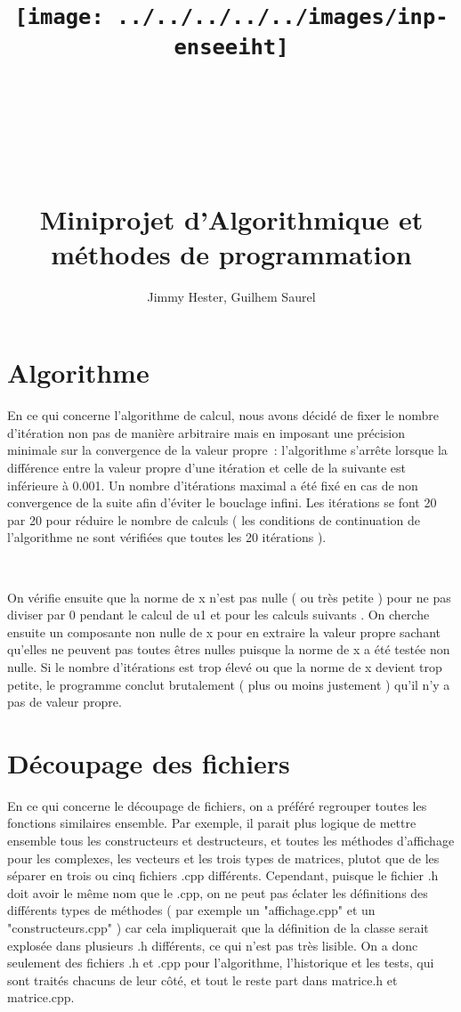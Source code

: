 \documentclass[a4paper]{article}
\title{\texttt{[image: ../../../../../images/inp-enseeiht]} \\ ~ \\ ~ \\ ~ \\ ~ \\ Miniprojet d'Algorithmique et méthodes de programmation}
\author{Jimmy Hester, Guilhem Saurel}
\date{\oldstylenums{\today}}
\begin{document}
\begin{titlepage}
 \maketitle
\end{titlepage}

\tableofcontents
\newpage

\section{Algorithme}

En ce qui concerne l'algorithme de calcul, nous avons décidé de fixer le nombre d'itération non pas de manière arbitraire mais en imposant une précision minimale sur la convergence de la valeur propre : l'algorithme s’arrête lorsque la différence entre la valeur propre d'une itération et celle de la suivante est inférieure à 0.001. Un nombre d'itérations maximal a été fixé en cas de non convergence de la suite afin d'éviter le bouclage infini. Les itérations se font 20 par 20 pour réduire le nombre de calculs ( les conditions de continuation de l'algorithme ne sont vérifiées que toutes les 20 itérations ).

~

On vérifie ensuite que la norme de x n'est pas nulle ( ou très petite ) pour ne pas diviser par 0 pendant le calcul de u1 et pour les calculs suivants . On cherche ensuite un composante non nulle de x pour en extraire la valeur propre sachant qu'elles ne peuvent pas toutes êtres nulles puisque la norme de x a été testée non nulle. Si le nombre d'itérations est trop élevé ou que la norme de x devient trop petite, le programme conclut brutalement ( plus ou moins justement ) qu'il n'y a pas de valeur propre.

\section{Découpage des fichiers}

En ce qui concerne le découpage de fichiers, on a préféré regrouper toutes les fonctions similaires ensemble. Par exemple, il parait plus logique de mettre ensemble tous les constructeurs et destructeurs, et toutes les méthodes d'affichage pour les complexes, les vecteurs et les trois types de matrices, plutot que de les séparer en trois ou cinq fichiers .cpp différents. Cependant, puisque le fichier .h doit avoir le même nom que le .cpp, on ne peut pas éclater les définitions des différents types de méthodes ( par exemple un "affichage.cpp" et un "constructeurs.cpp" ) car cela impliquerait que la définition de la classe serait explosée dans plusieurs .h différents, ce qui n'est pas très lisible. On a donc seulement des fichiers .h et .cpp pour l'algorithme, l'historique et les tests, qui sont traités chacuns de leur côté, et tout le reste part dans matrice.h et matrice.cpp.
\end{document}

